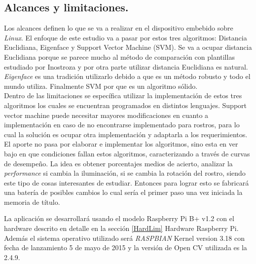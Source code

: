 \documentclass[letterpaper,12pt]{article}
\begin{document}
\newpage
\subsection{Alcances y limitaciones.} %

Los alcances definen lo que se va a realizar en el dispositivo embebido sobre \textit{Linux}. %
 El enfoque de este estudio va a pasar por estos tres algoritmos: Distancia Euclidiana, Eigenface y Support Vector Machine (SVM). Se va a ocupar distancia Euclidiana porque se parece mucho al método de comparación con plantillas estudiado por Inostroza \cite{ElectronicoUdeC} y por otra parte utilizar distancia Euclidiana es natural. \textit{Eigenface} es una tradición utilizarlo debido a que es un método robusto y todo el mundo utiliza. Finalmente SVM por que es un algoritmo sólido. \\
Dentro de las limitaciones se específica utilizar la implementación de estos tres algoritmos los cuales se encuentran programados en distintos lenguajes. Support vector machine puede necesitar mayores modificaciones en cuanto a implementación en caso de no encontrarse implementado para rostros, para lo cual la solución es ocupar otra implementación y adaptarla a los requerimientos.\\
El aporte no pasa por elaborar e implementar los algoritmos, sino esta en ver bajo en que condiciones fallan estos algoritmos, caracterizando a través de curvas de desempeño. La idea es obtener porcentajes medios de acierto, analizar la \emph{performance} si cambia la iluminación, si se cambia la rotación del rostro, siendo este tipo de cosas interesantes de estudiar. Entonces para lograr esto se fabricará una batería de posibles cambios lo cual sería el primer paso una vez iniciada la memoria de título.

La aplicación se desarrollará usando el modelo Raspberry Pi B+ v1.2 con el hardware descrito en detalle en la sección \ref{HardLim} Hardware Raspberry Pi. Además el sistema operativo utilizado será \textit{RASPBIAN} Kernel version 3.18 con fecha de lanzamiento 5 de mayo de 2015 y la versión de Open CV utilizada es la 2.4.9.  \\
\end{document}
